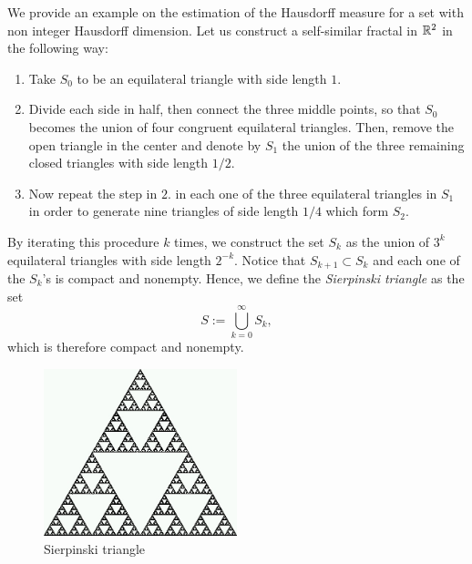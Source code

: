 \begin{example} We provide an example on the estimation of the Hausdorff measure for a set with non integer Hausdorff dimension.
Let us construct a self-similar fractal in $\mathbb{R}^{2}$ in the following way: 

\begin{enumerate}[1.]
\item Take $S_0$ to be an equilateral
triangle with side length $1$. 
\item Divide each side in half, then connect the three middle points, so that $S_0$ becomes the union of four congruent equilateral
triangles. Then, remove the open triangle in the center and denote by $S_{1}$ the union of the three remaining closed triangles with side length $1/2$.
\item Now repeat the step in $2.$ in each one of the three equilateral triangles in $S_{1}$ in order to generate nine triangles of side length $1/4$ which form $S_{2}$.
\end{enumerate}

By iterating this procedure $k$ times, we construct the set $S_k$ as the union of $3^k$ equilateral triangles with side length $2^{-k}$. Notice that $S_{k +1} \subset S_{k}$ and each one of the $S_{k}$'s is compact and nonempty. Hence, we define the {\em Sierpinski triangle} as the set
\begin{equation*}
S := \bigcup_{k=0}^\infty S_k,
\end{equation*}
which is therefore compact and nonempty. 

\begin{figure}[!ht]
\caption{Sierpinski triangle}
\centering
\includegraphics[width=0.5\textwidth]{sierpinski_triangle.jpg}
\end{figure}


\end{example}
